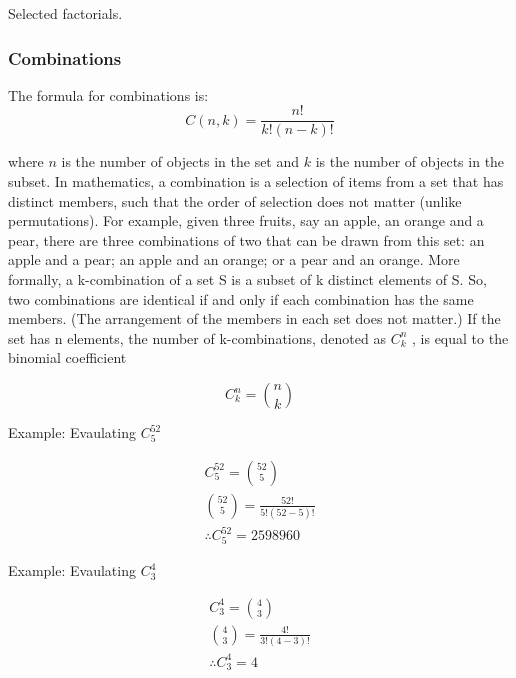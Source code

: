 \begin{center}
    Selected factorials.
\end{center}



\subsubsection{Combinations}

The formula for combinations is:
\begin{equation}
    C(n,k) = \frac{n!}{k!(n-k)!}
\end{equation}

where $n$ is the number of objects in the set and $k$ is the number of objects in the subset.
\linebreak
\linebreak
In mathematics, a combination is a selection of items from a set that has distinct members, such that the order of selection does not matter (unlike permutations). For example, given three fruits, say an apple, an orange and a pear, there are three combinations of two that can be drawn from this set: an apple and a pear; an apple and an orange; or a pear and an orange. More formally, a k-combination of a set S is a subset of k distinct elements of S. So, two combinations are identical if and only if each combination has the same members. (The arrangement of the members in each set does not matter.) If the set has n elements, the number of k-combinations, denoted as $C_{k}^{n}$ , is equal to the binomial coefficient

    \begin{equation}
        C_{k}^{n} = \binom{n}{k}
    \end{equation}

Example: Evaulating $C_{5}^{52}$


    
    \begin{equation}   
    \begin{split}     
        C_{5}^{52} = \binom{52}{5}  \\
        \binom{52}{5} = \frac{52!}{5!(52-5)!} \\
        \therefore C_{5}^{52} = 2598960
    \end{split}  
    \end{equation}

Example: Evaulating $C_{3}^{4}$

\begin{equation} 
    \begin{split}     
        C_{3}^{4} = \binom{4}{3}  \\
        \binom{4}{3} = \frac{4!}{3!(4-3)!} \\
        \therefore C_{3}^{4} = 4
    \end{split}
\end{equation}

